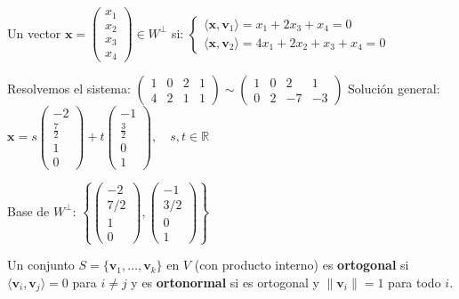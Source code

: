 \begin{myproof}
Un vector $\mathbf{x} = \begin{pmatrix} x_1 \\ x_2 \\ x_3 \\ x_4 \end{pmatrix} \in W^\perp$ si: \(
\begin{cases}
\langle \mathbf{x}, \mathbf{v}_1 \rangle = x_1 + 2x_3 + x_4 = 0 \\
\langle \mathbf{x}, \mathbf{v}_2 \rangle = 4x_1 + 2x_2 + x_3 + x_4 = 0
\end{cases}
\)

Resolvemos el sistema: \(
\begin{pmatrix}
1 & 0 & 2 & 1 \\
4 & 2 & 1 & 1
\end{pmatrix}
\sim
\begin{pmatrix}
1 & 0 & 2 & 1 \\
0 & 2 & -7 & -3
\end{pmatrix}
\)
Solución general: \(
\mathbf{x} = s \begin{pmatrix} -2 \\ \frac{7}{2} \\ 1 \\ 0 \end{pmatrix} + t \begin{pmatrix} -1 \\ \frac{3}{2} \\ 0 \\ 1 \end{pmatrix}, \quad s,t \in \mathbb{R}
\)


Base de $W^\perp$: $\left\{ \begin{pmatrix} -2 \\ 7/2 \\ 1 \\ 0 \end{pmatrix}, \begin{pmatrix} -1 \\ 3/2 \\ 0 \\ 1 \end{pmatrix} \right\}$
\end{myproof}

\begin{definition}
Un conjunto $S = \{ \mathbf{v}_1, \dots, \mathbf{v}_k \}$ en $V$ (con producto interno) es \textbf{ortogonal} si $\langle \mathbf{v}_i, \mathbf{v}_j \rangle = 0$ para $i \neq j$ y es \textbf{ortonormal} si es ortogonal y $\|\mathbf{v}_i\| = 1$ para todo $i.$
\end{definition}

